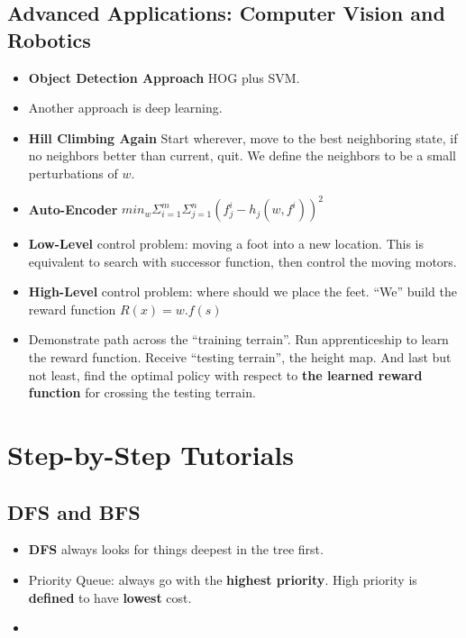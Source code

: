 \documentclass[twocolumn]{article}
\begin{document}
\subsection{Advanced Applications: Computer Vision and Robotics}
\label{sec:advanc-appl-comp}

\begin{itemize}
\item \textbf{Object Detection Approach} HOG plus SVM.
\item Another approach is deep learning.
\item \textbf{Hill Climbing Again} Start wherever, move to the best
  neighboring state, if no neighbors better than current, quit. We
  define the neighbors to be a small perturbations of $w$.
\item \textbf{Auto-Encoder}
  $min_{w}\Sigma_{i=1}^{m}\Sigma_{j=1}^{n}(f_{j}^{i} -h_
  {j}(w,f^{i}))^{2}$ 
\item \textbf{Low-Level} control problem: moving a foot into a new
  location. This is equivalent to search with successor function, then
  control the moving motors. 
\item \textbf{High-Level} control problem: where should we place the
  feet. ``We'' build the reward function $R(x)=w . f(s)$
\item Demonstrate path across the ``training terrain''. Run
  apprenticeship to learn the reward function. Receive ``testing
  terrain'', the height map. And last but not least, find the optimal
  policy with respect to \textbf{the learned reward function} for
  crossing the testing terrain.
\end{itemize}


\section{Step-by-Step Tutorials}
\label{sec:step-step-tutorials}

\subsection{DFS and BFS}
\label{sec:dfs-bfs}

\begin{itemize}
\item \textbf{DFS} always looks for things deepest in the tree first.
\item Priority Queue: always go with the \textbf{highest
    priority}. High priority is \textbf{defined} to have
  \textbf{lowest} cost.
\item 
\end{itemize}
\end{document}
